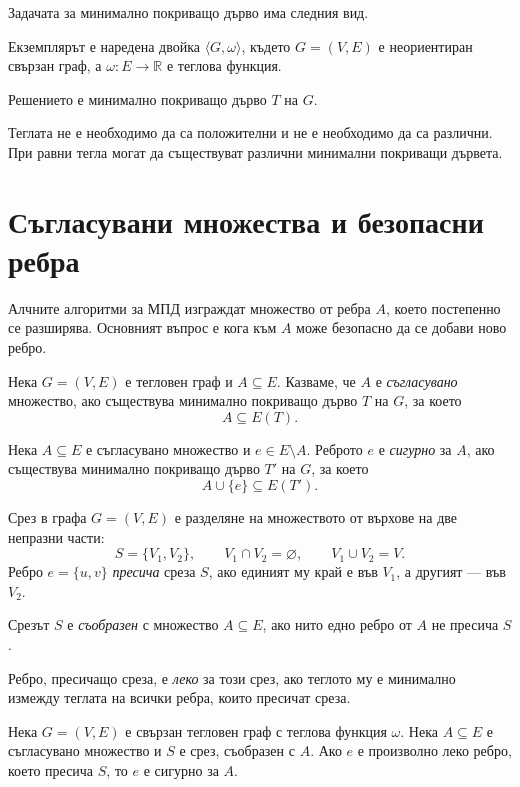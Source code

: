 \begin{keydefn}
Задачата за минимално покриващо дърво има следния вид.

Екземплярът е наредена двойка $\langle G,\omega\rangle$, където $G=(V,E)$ е неориентиран свързан граф, а $\omega:E\to\mathbb{R}$ е теглова функция.

Решението е минимално покриващо дърво $T$ на $G$.
\end{keydefn}

Теглата не е необходимо да са положителни и не е необходимо да са различни. При равни тегла могат да съществуват различни минимални покриващи дървета.

\section{Съгласувани множества и безопасни ребра}\label{s:7.2}

Алчните алгоритми за МПД изграждат множество от ребра $A$, което постепенно се разширява. Основният въпрос е кога към $A$ може безопасно да се добави ново ребро.

\begin{defn}
Нека $G=(V,E)$ е тегловен граф и $A\subseteq E$. Казваме, че $A$ е \emph{съгласувано} множество, ако съществува минимално покриващо дърво $T$ на $G$, за което
\[
A\subseteq E(T).
\]
\end{defn}

\begin{defn}
Нека $A\subseteq E$ е съгласувано множество и $e\in E\setminus A$. Реброто $e$ е \emph{сигурно} за $A$, ако съществува минимално покриващо дърво $T'$ на $G$, за което
\[
A\cup\{e\}\subseteq E(T').
\]
\end{defn}

\begin{defn}
Срез в графа $G=(V,E)$ е разделяне на множеството от върхове на две непразни части:
\[
S=\{V_1,V_2\},\qquad V_1\cap V_2=\varnothing,\qquad V_1\cup V_2=V.
\]
Ребро $e=\{u,v\}$ \emph{пресича} среза $S$, ако единият му край е във $V_1$, а другият --- във $V_2$.

Срезът $S$ е \emph{съобразен} с множество $A\subseteq E$, ако нито едно ребро от $A$ не пресича $S$.

Ребро, пресичащо среза, е \emph{леко} за този срез, ако теглото му е минимално измежду теглата на всички ребра, които пресичат среза.
\end{defn}

\begin{keythm}
Нека $G=(V,E)$ е свързан тегловен граф с теглова функция $\omega$. Нека $A\subseteq E$ е съгласувано множество и $S$ е срез, съобразен с $A$. Ако $e$ е произволно леко ребро, което пресича $S$, то $e$ е сигурно за $A$.
\end{keythm}

